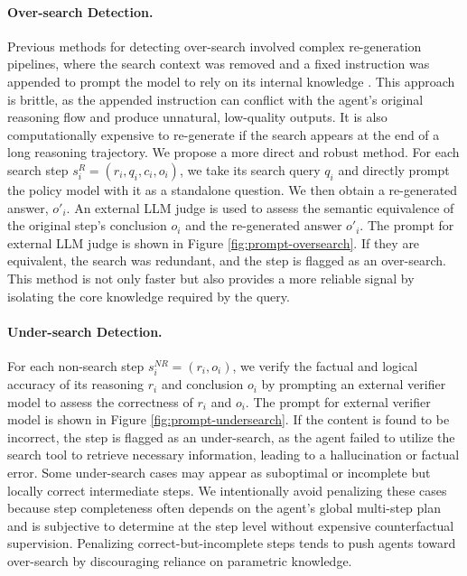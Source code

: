 \documentclass{article}
\begin{document}
\paragraph{Over-search Detection.} Previous methods for detecting over-search involved complex re-generation pipelines, where the search context was removed and a fixed instruction was appended to prompt the model to rely on its internal knowledge . This approach is brittle, as the appended instruction can conflict with the agent's original reasoning flow and produce unnatural, low-quality outputs. It is also computationally expensive to re-generate if the search appears at the end of a long reasoning trajectory. We propose a more direct and robust method. For each search step $s^R_i=(r_i, q_i, c_i, o_i)$, we take its search query $q_i$ and directly prompt the policy model with it as a standalone question. We then obtain a re-generated answer, $o'_i$. An external LLM judge is used to assess the semantic equivalence of the original step's conclusion $o_i$ and the re-generated answer $o'_i$. The prompt for external LLM judge is shown in Figure \ref{fig:prompt-oversearch}. If they are equivalent, the search was redundant, and the step is flagged as an over-search. This method is not only faster but also provides a more reliable signal by isolating the core knowledge required by the query.

\paragraph{Under-search Detection.} For each non-search step $s^{NR}_i=(r_i, o_i)$, we verify the factual and logical accuracy of its reasoning $r_i$ and conclusion $o_i$ by prompting an external verifier model to assess the correctness of $r_i$ and $o_i$. The prompt for external verifier model is shown in Figure \ref{fig:prompt-undersearch}. If the content is found to be incorrect, the step is flagged as an under-search, as the agent failed to utilize the search tool to retrieve necessary information, leading to a hallucination or factual error. Some under-search cases may appear as suboptimal or incomplete but locally correct intermediate steps. We intentionally avoid penalizing these cases because step completeness often depends on the agent's global multi-step plan and is subjective to determine at the step level without expensive counterfactual supervision. Penalizing correct-but-incomplete steps tends to push agents toward over-search by discouraging reliance on parametric knowledge.
\end{document}

